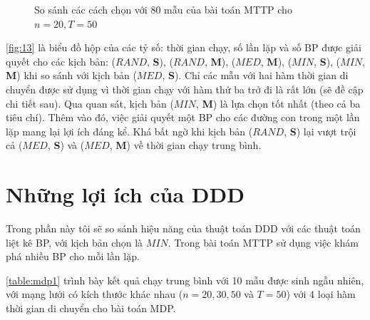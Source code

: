 \documentclass[../main.tex]{subfiles}
\begin{document}
\begin{figure}
  \caption{So sánh các cách chọn với 80 mẫu của bài toán MTTP cho \(n=20, T=50\)}
  \label{fig:13}
\end{figure}

\autoref{fig:13} là biểu đồ hộp của các tỷ số: thời gian chạy, số lần lặp và số
BP được giải quyết cho các kịch bản: (\(RAND\), \textbf{S}), (\(RAND\),
\textbf{M}), (\(MED\), \textbf{M}), (\(MIN\), \textbf{S}), (\(MIN\),
\textbf{M}) khi so sánh với kịch bản (\(MED\), \textbf{S}). Chỉ các mẫu
với hai hàm thời gian di chuyển được sử dụng vì thời gian chạy với hàm
thứ ba trở đi là rất lớn (sẽ đề cập chi tiết sau). Qua quan sát, kịch
bản (\(MIN\), \textbf{M}) là lựa chọn tốt nhất (theo cả ba tiêu chí).
Thêm vào đó, việc giải quyết một BP cho các đường con trong một lần lặp
mang lại lợi ích đáng kể. Khá bất ngờ khi kịch bản (\(RAND\),
\textbf{S}) lại vượt trội cả (\(MED\), \textbf{S}) và (\(MED\),
\textbf{M}) về thời gian chạy trung bình.

\section{Những lợi ích của
DDD}\label{nhux1eefng-lux1ee3i-uxedch-cux1ee7a-ddd}

Trong phần này tôi sẽ so sánh hiệu năng của thuật toán DDD với các thuật
toán liệt kê BP, với kịch bản chọn là \(MIN\). Trong bài toán MTTP sử
dụng việc khám phá nhiều BP cho mỗi lần lặp.

\autoref{table:mdp1} trình bày kết quả chạy trung bình với 10 mẫu được sinh ngẫu
nhiên, với mạng lưới có kích thước khác nhau (\(n=20,30,50\) và
\(T=50\)) với 4 loại hàm thời gian di chuyển cho bài toán MDP.
\end{document}
